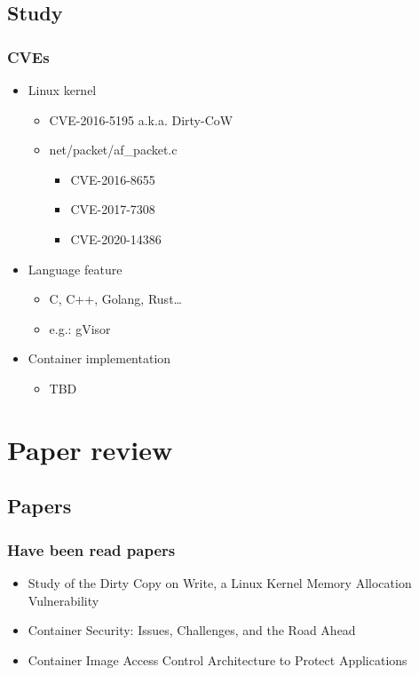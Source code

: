 \documentclass{beamer}
\begin{document}
\subsection{Study}
\begin{frame}
    \frametitle{CVEs}
    \begin{itemize}
        \item Linux kernel
              \begin{itemize}
                  \item CVE-2016-5195 a.k.a. Dirty-CoW
                  \item net/packet/af\_packet.c
                        \begin{itemize}
                            \item CVE-2016-8655
                            \item CVE-2017-7308
                            \item CVE-2020-14386
                        \end{itemize}
              \end{itemize}
        \item Language feature
              \begin{itemize}
                  \item C, C++, Golang, Rust\dots
                  \item e.g.: gVisor
              \end{itemize}
        \item Container implementation
              \begin{itemize}
                  \item TBD
              \end{itemize}
    \end{itemize}
\end{frame}


\section{Paper review}
\subsection{Papers}
\begin{frame}
    \frametitle{Have been read papers}
    \begin{itemize}
        \item Study of the Dirty Copy on Write, a Linux Kernel Memory Allocation Vulnerability\cite{Study_Dirty_Cow}
        \item Container Security: Issues, Challenges, and the Road Ahead\cite{Road_Ahead}
        \item Container Image Access Control Architecture to Protect Applications\cite{Access_Control_Architecture}
    \end{itemize}
\end{frame}
\end{document}

